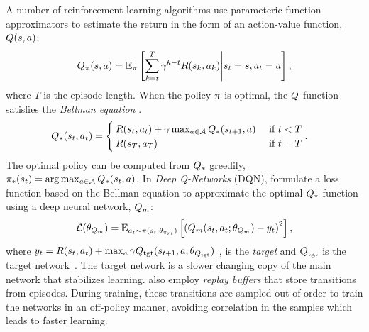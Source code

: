 A number of reinforcement learning algorithms use parameteric function
approximators to estimate the return in the form of 
an action-value function, $Q(s, a)$:
%
\begin{align}
Q_\pi(s, a) = \mathbb{E}_\pi\left[ \sum_{k=t}^T
  \gamma^{k-t} R(s_k, a_k)
  \middle| s_t = s, a_t = a \right] ,
  \label{eq:q-def}
\end{align}%
where $T$ is the episode length.
%
When the policy $\pi$ is optimal, the $Q$-function satisfies the
\emph{Bellman equation} \citep{bellman1954theory}.
%
\begin{align}
    Q_{*}(s_t, a_t)
  &=
    \begin{cases}
        R(s_t, a_t) + \gamma \max_{a \in \mathcal{A}}
        Q_{*}(s_{t+1}, a)
      & \text{ if } t < T
      \\
      R(s_T, a_T) & \text{ if } t = T
    \end{cases}.
  \label{eq:bellman}
\end{align}%
%
The optimal policy can be computed from $Q_{*}$ greedily, 
$\pi_*(s_t) = \arg \max_{a \in \mathcal{A}} Q_*(s_t,
a)$.
In \emph{Deep Q-Networks} (DQN), \citet{mnih2013playing} formulate a loss function based on 
the Bellman equation to approximate the optimal $Q_{*}$-function using
a deep neural network, $Q_m$:
%
%
\begin{align}
  \mathcal{L}(\theta_{Q_m}) =
    \mathbb{E}_{a_t\sim\pi(s_t; \theta_{\pi_m})}\left[\left(
  Q_m(s_t, a_t; \theta_{Q_m}) -
  y_t  \right)^2\right],
  \label{eq:bellman-dqn}
\end{align}
where 
$y_t = R(s_t, a_t) + \max_{a}\gamma Q_{\text{tgt}}(s_{t+1}, a; \theta_{Q_{\text{tgt}}}) $
, is the \emph{target} and $Q_{\text{tgt}}$ is the target
network~\citep{MnKaSiNATURE2015}.
The target network is a slower
changing copy of the main network that stabilizes learning.
\citet{MnKaSiNATURE2015} also employ \emph{replay buffers}
that store transitions from episodes. During training, these transitions are
sampled out of order to train the networks in an off-policy manner, avoiding
correlation in the samples which leads to faster learning.

